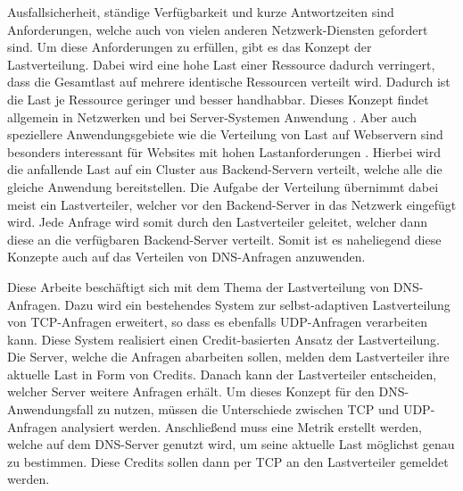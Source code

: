 \documentclass[a4paper, 12pt, BCOR10mm, DIV12, toc=bibliography, toc=listof, german]{scrbook}
\begin{document}
		Ausfallsicherheit, ständige Verfügbarkeit und kurze Antwortzeiten sind Anforderungen, welche
		auch von vielen anderen Netzwerk-Diensten gefordert sind. Um diese Anforderungen zu erfüllen,
		gibt es das Konzept der Lastverteilung. Dabei wird eine hohe Last einer Ressource dadurch
		verringert, dass die Gesamtlast auf mehrere identische Ressourcen verteilt wird. Dadurch ist die
		Last je Ressource geringer und besser handhabbar. Dieses Konzept findet allgemein in Netzwerken
		und bei Server-Systemen Anwendung \cite{bourke2001, kopparapu2002}. Aber auch speziellere
		Anwendungsgebiete wie die Verteilung von Last auf Webservern sind besonders interessant für
		Websites mit hohen Lastanforderungen \cite{meplho2012}. Hierbei wird die anfallende Last auf ein
		Cluster aus Backend-Servern verteilt, welche alle	die gleiche Anwendung bereitstellen. Die
		Aufgabe der Verteilung übernimmt dabei meist ein Lastverteiler, welcher vor den Backend-Server
		in das Netzwerk eingefügt wird. Jede Anfrage wird somit durch den Lastverteiler geleitet,
		welcher dann diese an die verfügbaren Backend-Server verteilt.  Somit ist es naheliegend diese
		Konzepte auch auf das Verteilen von DNS-Anfragen anzuwenden.

		Diese Arbeite beschäftigt sich mit dem Thema der Lastverteilung von DNS-Anfragen. Dazu wird ein
		bestehendes System \cite{scsczile2008,zinke2012} zur selbst-adaptiven Lastverteilung von
		TCP-Anfragen erweitert, so dass es ebenfalls UDP-Anfragen verarbeiten kann. Diese System
		realisiert einen Credit-basierten Ansatz der Lastverteilung. Die Server, welche die Anfragen
		abarbeiten sollen, melden dem Lastverteiler ihre aktuelle Last in Form von Credits. Danach kann
		der Lastverteiler entscheiden, welcher Server weitere Anfragen erhält. Um dieses Konzept für den
		DNS-Anwendungsfall zu nutzen, müssen die Unterschiede zwischen TCP und UDP-Anfragen analysiert
		werden. Anschließend muss eine Metrik erstellt werden, welche auf dem DNS-Server genutzt wird,
		um seine aktuelle Last möglichst genau zu bestimmen. Diese Credits sollen dann per TCP an den
		Lastverteiler gemeldet werden.
\end{document}
